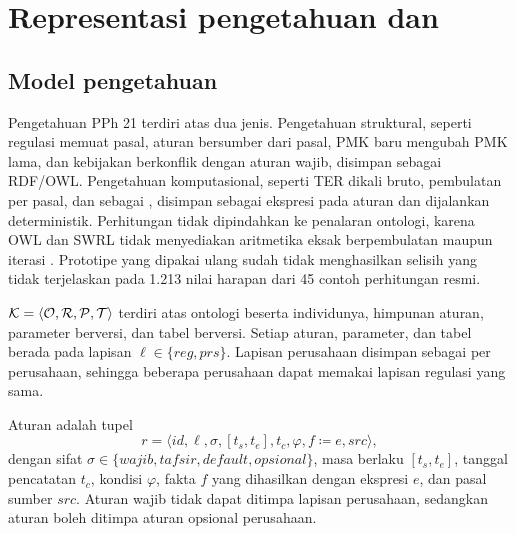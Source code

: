 \section{Representasi pengetahuan dan }
\label{sec:representasi}

\subsection{Model pengetahuan}
Pengetahuan PPh 21 terdiri atas dua jenis. Pengetahuan struktural, seperti regulasi memuat pasal, aturan bersumber dari pasal, PMK baru mengubah PMK lama, dan kebijakan berkonflik dengan aturan wajib, disimpan sebagai  RDF/OWL. Pengetahuan komputasional, seperti TER dikali bruto, pembulatan per pasal, dan  sebagai , disimpan sebagai ekspresi pada  aturan dan dijalankan  deterministik. Perhitungan tidak dipindahkan ke penalaran ontologi, karena OWL dan SWRL tidak menyediakan aritmetika eksak berpembulatan maupun iterasi . Prototipe  yang dipakai ulang sudah tidak menghasilkan selisih yang tidak terjelaskan pada 1.213 nilai harapan dari 45 contoh perhitungan resmi.

\begin{definisi}
\label{def:kb}
$\mathcal{K} = \langle \mathcal{O}, \mathcal{R}, \mathcal{P}, \mathcal{T} \rangle$ terdiri atas ontologi beserta individunya, himpunan aturan, parameter berversi, dan tabel berversi. Setiap aturan, parameter, dan tabel berada pada lapisan $\ell \in \{\mathit{reg}, \mathit{prs}\}$. Lapisan perusahaan disimpan sebagai  per perusahaan, sehingga beberapa perusahaan dapat memakai lapisan regulasi yang sama.
\end{definisi}

\begin{definisi}[Aturan]
\label{def:aturan}
Aturan adalah tupel
\[ r = \langle \mathit{id}, \ell, \sigma, [t_s, t_e], t_c, \varphi, f \coloneqq e, \mathit{src} \rangle, \]
dengan sifat $\sigma \in \{\mathit{wajib}, \mathit{tafsir}, \mathit{default}, \mathit{opsional}\}$, masa berlaku $[t_s, t_e]$, tanggal pencatatan $t_c$, kondisi $\varphi$, fakta $f$ yang dihasilkan dengan ekspresi $e$, dan pasal sumber $\mathit{src}$. Aturan wajib tidak dapat ditimpa lapisan perusahaan, sedangkan aturan  boleh ditimpa aturan opsional perusahaan.
\end{definisi}

